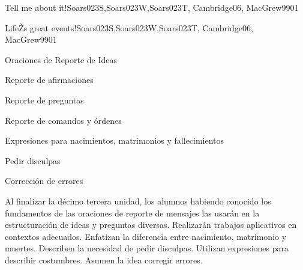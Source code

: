 \begin{syllabus}
\begin{unit}{Tell me about it!}{Soars023S,Soars023W,Soars023T, Cambridge06, MacGrew99}{0}{1}
\end{unit}

\begin{unit}{LifeŽs great events!}{Soars023S,Soars023W,Soars023T, Cambridge06, MacGrew99}{0}{1}
   \begin{topics}
      \item Oraciones de Reporte de Ideas
      \item Reporte de afirmaciones
      \item Reporte de preguntas
      \item Reporte de comandos y órdenes
      \item Expresiones para nacimientos, matrimonios y fallecimientos
      \item Pedir disculpas
      \item Corrección de errores
   \end{topics}

   \begin{unitgoals}
      \item Al finalizar la décimo tercera unidad, los alumnos habiendo conocido los fundamentos de las oraciones de reporte de mensajes las usarán en la estructuración de ideas y preguntas diversas. Realizarán trabajos aplicativos en contextos adecuados. Enfatizan la diferencia entre nacimiento, matrimonio y muertes. Describen la necesidad de pedir disculpas. Utilizan expresiones para describir costumbres. Asumen la idea corregir errores.
   \end{unitgoals}
\end{unit}

\begin{coursebibliography}
\end{coursebibliography}
\end{syllabus}
%

